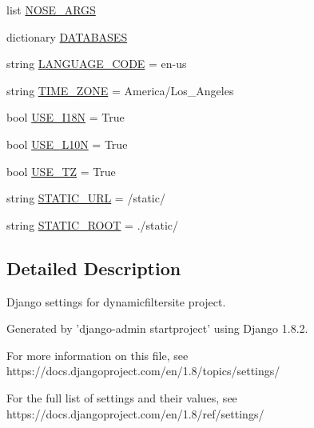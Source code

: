 \begin{DoxyCompactItemize}
\item 
list \mbox{\hyperlink{namespacedynamicfiltersite_1_1settings_a4b4f0b801c1d1b0fee67c8f45391ffb1}{N\+O\+S\+E\+\_\+\+A\+R\+GS}}
\item 
dictionary \mbox{\hyperlink{namespacedynamicfiltersite_1_1settings_a231cae2a3420dacff7b58a500c6b9555}{D\+A\+T\+A\+B\+A\+S\+ES}}
\item 
string \mbox{\hyperlink{namespacedynamicfiltersite_1_1settings_a85bdb273c38bd7f0a06a3a38aa81225c}{L\+A\+N\+G\+U\+A\+G\+E\+\_\+\+C\+O\+DE}} = \textquotesingle{}en-\/us\textquotesingle{}
\item 
string \mbox{\hyperlink{namespacedynamicfiltersite_1_1settings_a037ffded91b7904e73dda92d116594c6}{T\+I\+M\+E\+\_\+\+Z\+O\+NE}} = \textquotesingle{}America/Los\+\_\+\+Angeles\textquotesingle{}
\item 
bool \mbox{\hyperlink{namespacedynamicfiltersite_1_1settings_aa385f7186a262f3a197d89b86cd5b44f}{U\+S\+E\+\_\+\+I18N}} = True
\item 
bool \mbox{\hyperlink{namespacedynamicfiltersite_1_1settings_a2578e043379f868f8693d8299d915972}{U\+S\+E\+\_\+\+L10N}} = True
\item 
bool \mbox{\hyperlink{namespacedynamicfiltersite_1_1settings_a1ad6572b69b47cfda1778bf6e9cb6343}{U\+S\+E\+\_\+\+TZ}} = True
\item 
string \mbox{\hyperlink{namespacedynamicfiltersite_1_1settings_a428f2ec992bf4fd72c3c6344615535b0}{S\+T\+A\+T\+I\+C\+\_\+\+U\+RL}} = \textquotesingle{}/static/\textquotesingle{}
\item 
string \mbox{\hyperlink{namespacedynamicfiltersite_1_1settings_a25a1de2d4f1677736b014389b835ff8b}{S\+T\+A\+T\+I\+C\+\_\+\+R\+O\+OT}} = \textquotesingle{}./static/\textquotesingle{}
\end{DoxyCompactItemize}


\subsection{Detailed Description}
\begin{DoxyVerb}Django settings for dynamicfiltersite project.

Generated by 'django-admin startproject' using Django 1.8.2.

For more information on this file, see
https://docs.djangoproject.com/en/1.8/topics/settings/

For the full list of settings and their values, see
https://docs.djangoproject.com/en/1.8/ref/settings/
\end{DoxyVerb}
 

